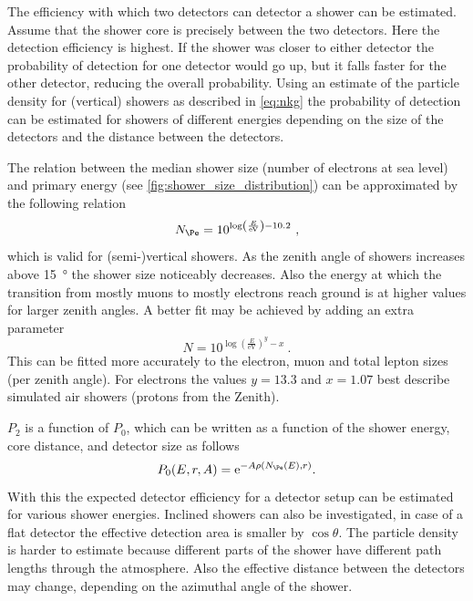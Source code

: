 The efficiency with which two detectors can detector a shower can be estimated. Assume that the shower core is precisely between the two detectors. Here the detection efficiency is highest. If the shower was closer to either detector the probability of detection for one detector would go up, but it falls faster for the other detector, reducing the overall probability. Using an estimate of the particle density for (vertical) showers as described in \cref{eq:nkg} the probability of detection can be estimated for showers of different energies depending on the size of the detectors and the distance between the detectors.

The relation between the median shower size (number of electrons at sea level) and primary energy (see \cref{fig:shower_size_distribution}) can be approximated by the following relation
%
\begin{equation}
    N_{\Pe} = 10^{\log\left(\frac{E}{\si{\eV}}\right) - 10.2} \ ,
\end{equation}
%
which is valid for (semi-)vertical showers. As the zenith angle of showers increases above \SI{15}{\degree} the shower size noticeably decreases. Also the energy at which the transition from mostly muons to mostly electrons reach ground is at higher values for larger zenith angles. A better fit may be achieved by adding an extra parameter
%
\begin{equation}
    N = 10^{\log\left(\frac{E}{\si{\eV}}\right)^y - x} \ .
\end{equation}
%
This can be fitted more accurately to the electron, muon and total lepton sizes (per zenith angle). For electrons the values $y = 13.3$ and $x = 1.07$ best describe simulated air showers (protons from the Zenith).

$P_2$ is a function of $P_0$, which can be written as a function of the shower energy, core distance, and detector size as follows
%
\begin{equation}
    P_0(E, r, A) = \mathrm{e}^{-A\rho(N_{\Pe}(E), r)} \\ .
\end{equation}
%
With this the expected detector efficiency for a detector setup can be estimated for various shower energies. Inclined showers can also be investigated, in case of a flat detector the effective detection area is smaller by $\cos \theta$. The particle density is harder to estimate because different parts of the shower have different path lengths through the atmosphere. Also the effective distance between the detectors may change, depending on the azimuthal angle of the shower.

